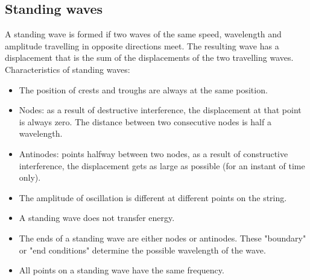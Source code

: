 \documentclass[a4paper,12pt]{article}
\begin{document}
\subsection{Standing waves}
A standing wave is formed if two waves of the same speed, wavelength and amplitude travelling in opposite directions meet.
The resulting wave has a displacement that is the sum of the displacements of the two travelling waves.\\
Characteristics of standing waves:
\begin{itemize}
  \item The position of crests and troughs are always at the same position.
  \item Nodes: as a result of destructive interference, the displacement at that point is always zero. The distance between two consecutive nodes is half a wavelength.
  \item Antinodes: points halfway between two nodes, as a result of constructive interference, the displacement gets as large as possible (for an instant of time only).
  \item The amplitude of oscillation is different at different points on the string.
  \item A standing wave does not transfer energy.
  \item The ends of a standing wave are either nodes or antinodes. These "boundary" or "end conditions" determine the possible wavelength of the wave.
  \item All points on a standing wave have the same frequency.
\end{itemize}
\end{document}

